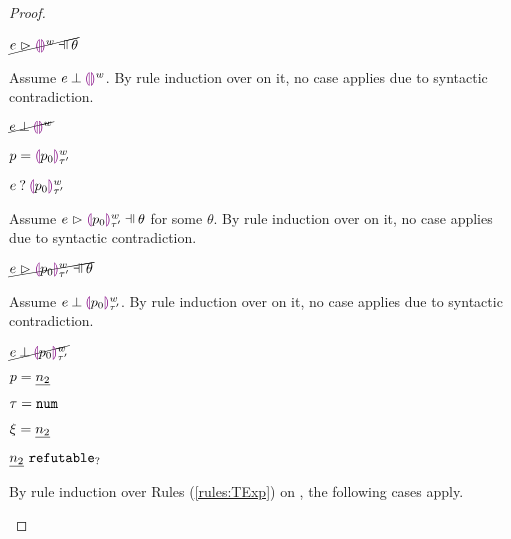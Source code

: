\begin{proof}
\begin{byCases}
\begin{pfsteps*}
    \item $\cancel{\hpatmatch{e}{\heholep{w}}{\theta}}$ 
    \end{pfsteps*}
    Assume $e \mathbin{\bot} \textcolor{violet}{\llparenthesis}\textcolor{violet}{\rrparenthesis}^{w}$. By rule induction over  on it, no case applies due to syntactic contradiction.
    \begin{pfsteps*}
    \item $\cancel{e \mathbin{\bot} \textcolor{violet}{\llparenthesis}\textcolor{violet}{\rrparenthesis}^{w}}$ 
    \end{pfsteps*}
\item[\text{(\ref{rule:PTHole})}]
    \begin{pfsteps*}
    \item $p=\textcolor{violet}{\llparenthesis} p_0\textcolor{violet}{\rrparenthesis}^{w}_{\tau'}$ 
    \item $e \mathbin{?} \textcolor{violet}{\llparenthesis} p_0\textcolor{violet}{\rrparenthesis}^{w}_{\tau'}$ 
    \end{pfsteps*}
    Assume $\hpatmatch{e}{\hholep{p_0}{w}{\tau'}}{\theta}$ for some $\theta$. By rule induction over  on it, no case applies due to syntactic contradiction.
    \begin{pfsteps*}
    \item $\cancel{\hpatmatch{e}{\hholep{p_0}{w}{\tau'}}{\theta}}$ 
    \end{pfsteps*}
    Assume $e \mathbin{\bot} \textcolor{violet}{\llparenthesis} p_0\textcolor{violet}{\rrparenthesis}^{w}_{\tau'}$. By rule induction over  on it, no case applies due to syntactic contradiction.
    \begin{pfsteps*}
    \item $\cancel{e \mathbin{\bot} \textcolor{violet}{\llparenthesis} p_0\textcolor{violet}{\rrparenthesis}^{w}_{\tau'}}$ 
    \end{pfsteps*}
\item[\text{(\ref{rule:PTNum})}]
    \begin{pfsteps*}
    \item $p=\underline{n_2}$ 
    \item $\tau=\mathtt{num}$ 
    \item $\xi=\underline{n_2}$ 
    \item $\underline{n_2} ~\mathtt{refutable}_?$  
    \end{pfsteps*}
    By rule induction over Rules (\ref{rules:TExp}) on , the following cases apply.
    \begin{byCases}
    \item[\text{(\ref{rule:TEHole}),(\ref{rule:THole}),(\ref{rule:TAp}),(\ref{rule:TPrl}),(\ref{rule:TPrr}),(\ref{rule:TMatchZPre}),(\ref{rule:TMatchNZPre})}]

\end{byCases}
\end{byCases}
\end{proof}
